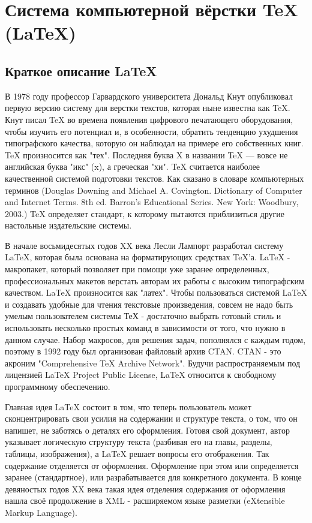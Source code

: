 \documentclass[a4paper,14pt]{report} %
\begin{document}
\tableofcontents %
\chapter{Система компьютерной вёрстки TeX (LaTeX)}
\section{Краткое описание LaTeX}
В 1978 году профессор Гарвардского университета Дональд Кнут опубликовал первую версию систему для верстки текстов, которая ныне известна как TeX.  Кнут писал TeX во времена появления цифрового печатающего оборудования, чтобы изучить его потенциал и, в особенности, обратить тенденцию ухудшения типографского качества, которую он наблюдал на примере его собственных книг. TeX произносится как "тех". Последняя буква X в названии TeX — вовсе не английская буква "икс" (x), а греческая "хи". TeX считается наиболее качественной системой подготовки текстов. Как сказано в словаре компьютерных терминов (Douglas Downing and Michael A. Covington. Dictionary of Computer and Internet Terms. 8th ed. Barron's Educational Series. New York: Woodbury, 2003.) TeX определяет стандарт, к которому пытаются приблизиться другие настольные издательские системы.
\par
В начале восьмидесятых годов XX века Лесли Лампорт разработал систему LaTeX, которая была основана на форматирующих средствах TeX'а. LaTeX - макропакет, который позволяет при помощи уже заранее определенных, профессиональных макетов верстать авторам их работы с высоким типографским качеством. LaTeX произносится как "латех". Чтобы пользоваться системой LaTeX и создавать удобные для чтения текстовые произведения, совсем не надо быть умелым пользователем системы ТеХ - достаточно выбрать готовый стиль и использовать несколько простых команд в зависимости от того, что нужно в данном случае. Набор макросов, для решения задач, пополнялся с каждым годом, поэтому в 1992 году был организован файловый архив CTAN. CTAN - это акроним "Comprehensive TeX Archive Network". Будучи распространяемым под лицензией LaTeX Project Public License, LaTeX относится к свободному программному обеспечению.
\par
Главная идея LaTeX состоит в том, что теперь пользователь может сконцентрировать свои усилия на содержании и структуре текста, о том, что он напишет, не заботясь о деталях его оформления. Готовя свой документ, автор указывает логическую структуру текста (разбивая его на главы, разделы, таблицы, изображения), а LaTeX решает вопросы его отображения. Так содержание отделяется от оформления. Оформление при этом или определяется заранее (стандартное), или разрабатывается для конкретного документа. В конце девяностых годов XX века такая идея отделения содержания от оформления нашла своё продолжение в XML - расширяемом языке разметки (eXtensible Markup Language).
\end{document}
